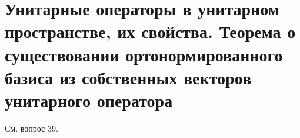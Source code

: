 \section{Унитарные операторы в унитарном пространстве, их свойства. Теорема о существовании ортонормированного базиса из собственных векторов унитарного оператора}

См. вопрос 39.

